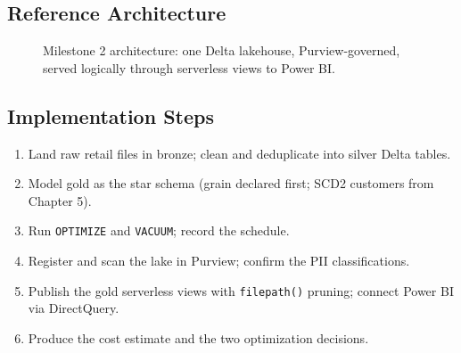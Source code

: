 \subsection*{Reference Architecture}
\begin{figure}[H]
    \centering
    \caption{Milestone 2 architecture: one Delta lakehouse, Purview-governed, served logically through serverless views to Power BI.}
    \label{fig:ch8-capstone-arch}
\end{figure}

\subsection*{Implementation Steps}
\begin{enumerate}
    \item Land raw retail files in bronze; clean and deduplicate into silver Delta tables.
    \item Model gold as the star schema (grain declared first; SCD2 customers from Chapter 5).
    \item Run \texttt{OPTIMIZE} and \texttt{VACUUM}; record the schedule.
    \item Register and scan the lake in Purview; confirm the PII classifications.
    \item Publish the gold serverless views with \texttt{filepath()} pruning; connect Power BI via DirectQuery.
    \item Produce the cost estimate and the two optimization decisions.
\end{enumerate}

